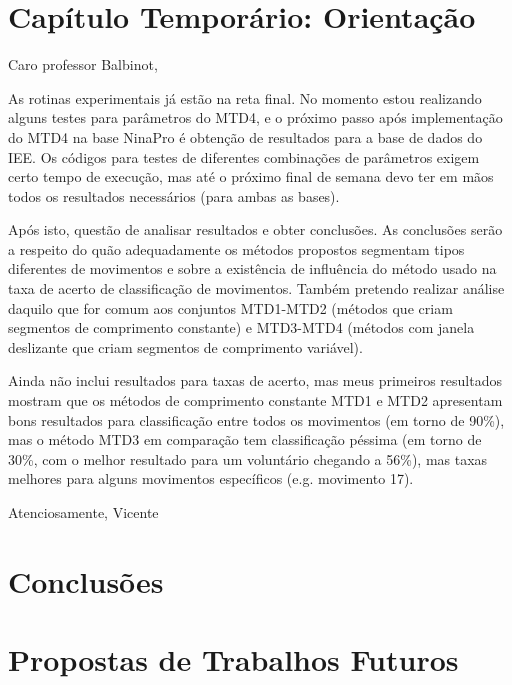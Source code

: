 

	\chapter{Capítulo Temporário: Orientação}
Caro professor Balbinot,

As rotinas experimentais já estão na reta final. No momento estou realizando alguns testes para parâmetros do MTD4, e o próximo passo após implementação do MTD4 na base NinaPro é obtenção de resultados para a base de dados do IEE. Os códigos para testes de diferentes combinações de parâmetros exigem certo tempo de execução, mas até o próximo final de semana devo ter em mãos todos os resultados necessários (para ambas as bases).

Após isto, questão de analisar resultados e obter conclusões. As conclusões serão a respeito do quão adequadamente os métodos propostos segmentam tipos diferentes de movimentos e sobre a existência de influência do método usado na taxa de acerto de classificação de movimentos. Também pretendo realizar análise daquilo que for comum aos conjuntos MTD1-MTD2 (métodos que criam segmentos de comprimento constante) e MTD3-MTD4 (métodos com janela deslizante que criam segmentos de comprimento variável).

Ainda não inclui resultados para taxas de acerto, mas meus primeiros resultados mostram que os métodos de comprimento constante MTD1 e MTD2 apresentam bons resultados para classificação entre todos os movimentos (em torno de 90\%), mas o método MTD3 em comparação tem classificação péssima (em torno de 30\%, com o melhor resultado para um voluntário chegando a 56\%), mas taxas melhores para alguns movimentos específicos (e.g. movimento 17).

Atenciosamente,
Vicente

	\chapter{Conclusões}

	\chapter{Propostas de Trabalhos Futuros}

